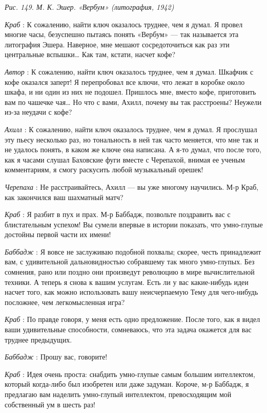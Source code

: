 \documentclass[../main.tex]{subfiles}
\begin{document}
\begin{dialogue}
\emph{Рис. 149. М. К. Эшер. «Вербум» (литография, 1942)}

\emph{Краб} : К сожалению, найти ключ оказалось труднее, чем я думал. Я провел многие часы, безуспешно пытаясь понять «Вербум» --- так называется эта литография Эшера. Наверное, мне мешают сосредоточиться как раз эти центральные вспышки\ldots{} Как там, кстати, насчет кофе?

\emph{Автор} : К сожалению, найти ключ оказалось труднее, чем я думал. Шкафчик с кофе оказался заперт! Я перепробовал все ключи, что лежат в коробке около шкафа, и ни один из них не подошел. Пришлось мне, вместо кофе, приготовить вам по чашечке чая\ldots{} Но что с вами, Ахилл, почему вы так расстроены? Неужели из-за неудачи с кофе?

\emph{Ахилл} : К сожалению, найти ключ оказалось труднее, чем я думал. Я прослушал эту пьесу несколько раз, но тональность в ней так часто меняется, что мне так и не удалось понять, в каком же ключе она написана. А я-то думал, что после того, как я часами слушал Баховские фуги вместе с Черепахой, внимая ее ученым комментариям, я смогу раскусить любой музыкальный орешек!

\emph{Черепаха} : Не расстраивайтесь, Ахилл --- вы уже многому научились. М-р Краб, как закончился ваш шахматный матч?

\emph{Краб} : Я разбит в пух и прах. М-р Баббадж, позвольте поздравить вас с блистательным успехом! Вы сумели впервые в истории показать, что умно-глупые достойны первой части их имени!

\emph{Баббадж} : Я вовсе не заслуживаю подобной похвалы; скорее, честь принадлежит вам, с удивительной дальновидностью собравшему так много умно-глупых. Без сомнения, рано или поздно они произведут революцию в мире вычислительной техники. А теперь я снова к вашим услугам. Есть ли у вас какие-нибудь идеи насчет того, как можно использовать вашу неисчерпаемую Тему для чего-нибудь посложнее, чем легкомысленная игра?

\emph{Краб} : По правде говоря, у меня есть одно предложение. После того, как я видел ваши удивительные способности, сомневаюсь, что эта задача окажется для вас труднее предыдущих.

\emph{Баббадж} : Прошу вас, говорите!

\emph{Краб} : Идея очень проста: снабдить умно-глупые самым большим интеллектом, который когда-либо был изобретен или даже задуман. Короче, м-р Баббадж, я предлагаю вам наделить умно-глупый интеллектом, превосходящим мой собственный ум в шесть раз!


\end{dialogue}
\end{document}
